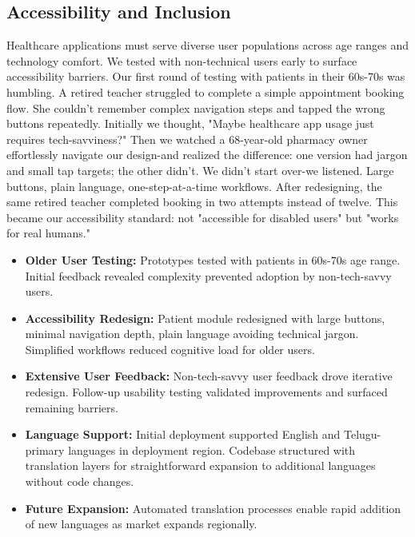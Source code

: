 \documentclass[12pt,a4paper]{report}
\begin{document}
\subsection{Accessibility and Inclusion}

Healthcare applications must serve diverse user populations across age ranges and technology comfort. We tested with non-technical users early to surface accessibility barriers. Our first round of testing with patients in their 60s-70s was humbling. A retired teacher struggled to complete a simple appointment booking flow. She couldn't remember complex navigation steps and tapped the wrong buttons repeatedly. Initially we thought, "Maybe healthcare app usage just requires tech-savviness?" Then we watched a 68-year-old pharmacy owner effortlessly navigate our design-and realized the difference: one version had jargon and small tap targets; the other didn't. We didn't start over-we listened. Large buttons, plain language, one-step-at-a-time workflows. After redesigning, the same retired teacher completed booking in two attempts instead of twelve. This became our accessibility standard: not "accessible for disabled users" but "works for real humans."

\begin{itemize}
  \item \textbf{Older User Testing:} Prototypes tested with patients in 60s-70s age range. Initial feedback revealed complexity prevented adoption by non-tech-savvy users.

  \item \textbf{Accessibility Redesign:} Patient module redesigned with large buttons, minimal navigation depth, plain language avoiding technical jargon. Simplified workflows reduced cognitive load for older users.

  \item \textbf{Extensive User Feedback:} Non-tech-savvy user feedback drove iterative redesign. Follow-up usability testing validated improvements and surfaced remaining barriers.

  \item \textbf{Language Support:} Initial deployment supported English and Telugu-primary languages in deployment region. Codebase structured with translation layers for straightforward expansion to additional languages without code changes.

  \item \textbf{Future Expansion:} Automated translation processes enable rapid addition of new languages as market expands regionally.
\end{itemize}
\end{document}
